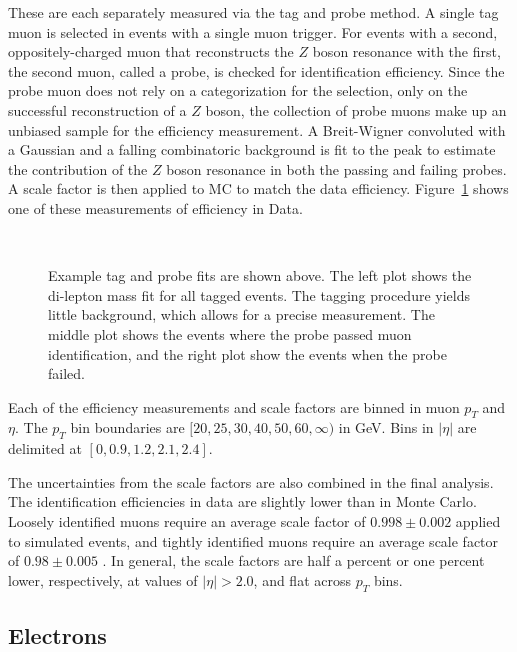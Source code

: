 These are each separately measured via the tag and probe method.
A single tag muon is selected in events with a single muon trigger.
For events with a second, oppositely-charged muon
that reconstructs the $Z$ boson resonance with the first,
the second muon, called a probe, is checked for identification efficiency.
Since the probe muon does not rely on a categorization for the selection,
only on the successful reconstruction of a $Z$ boson,
the collection of probe muons make up an unbiased sample for the efficiency measurement.
A Breit-Wigner convoluted with a Gaussian and a falling combinatoric background
is fit to the peak to estimate the contribution
of the $Z$ boson resonance in both the passing and failing probes.
A scale factor is then applied to MC to match the data efficiency.
Figure~\ref{fig:muon-tag-probe} shows one of these measurements of efficiency in Data.
\begin{figure}
  \centering
  ~
  ~
  \caption[Tag and probe fits]{
    Example tag and probe fits are shown above.
    The left plot shows the di-lepton mass fit for all tagged events.
    The tagging procedure yields little background, which allows for a precise measurement.
    The middle plot shows the events where the probe passed muon identification,
    and the right plot show the events when the probe failed.
    }
  \label{fig:muon-tag-probe}
\end{figure}
Each of the efficiency measurements and scale factors are binned
in muon $p_T$ and $\eta$.
The $p_T$ bin boundaries are $[20, 25, 30, 40, 50, 60, \infty)$ in GeV.
Bins in $|\eta|$ are delimited at $[0, 0.9, 1.2, 2.1, 2.4]$.

The uncertainties from the scale factors are also combined in the final analysis.
The identification efficiencies in data are slightly lower than in Monte Carlo.
Loosely identified muons require an average scale factor of $0.998\pm0.002$ applied to simulated events,
and tightly identified muons require an average scale factor of $0.98\pm0.005$
\cite{CMS-DP-2019-022}.
In general, the scale factors are half a percent or one percent lower, respectively,
at values of $|\eta| > 2.0$, and flat across $p_T$ bins.

\subsection{Electrons}

